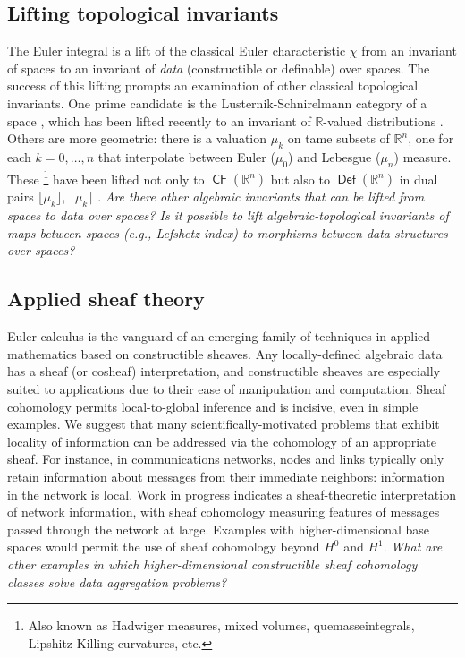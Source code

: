 \documentclass{psapm-l}
\theoremstyle{definition}
\theoremstyle{remark}
\numberwithin{equation}{section}
\begin{document}
\subsection{Lifting topological invariants}
The Euler integral is a lift of the classical Euler characteristic $\chi$ from an invariant of spaces to an invariant of {\em data} (constructible or definable) over spaces. The success of this lifting prompts an examination of other classical topological invariants. One prime candidate is the Lusternik-Schnirelmann category of a space \cite{CLOT}, which has been lifted recently to an invariant of ${{\mathbb R}}$-valued distributions \cite{BG:uni}. Others are more geometric: there is a valuation $\mu_k$ on tame subsets of ${{\mathbb R}}^n$, one for each $k=0,\ldots,n$ that interpolate between Euler ($\mu_0$) and Lebesgue ($\mu_n$) measure. These {{}}\footnote{Also known as Hadwiger measures, mixed volumes, quemasseintegrals, Lipshitz-Killing curvatures, etc.} have been lifted not only to ${{{\operatorname{\mathsf{{CF}}}}}}({{\mathbb R}}^n)$ but also to ${{{\operatorname{\mathsf{{Def}}}}}}({{\mathbb R}}^n)$ in dual pairs $\lfloor\mu_k\rfloor$, $\lceil\mu_k\rceil$ \cite{Wright}. {\em Are there other algebraic invariants that can be lifted from spaces to data over spaces? Is it possible to lift algebraic-topological invariants of maps between spaces ({{\em e.g.}}, Lefshetz index) to morphisms between data structures over spaces?}

\subsection{Applied sheaf theory}
Euler calculus is the vanguard of an emerging family of techniques in applied mathematics based on constructible sheaves. Any locally-defined algebraic data has a sheaf (or cosheaf) interpretation, and constructible sheaves are especially suited to applications due to their ease of manipulation and computation.  Sheaf cohomology permits local-to-global inference and is incisive, even in simple examples. We suggest that many scientifically-motivated problems that exhibit locality of information can be addressed via the cohomology of an appropriate sheaf. For instance, in communications networks, nodes and links typically only retain information about messages from their immediate neighbors: information in the network is local. Work in progress \cite{Rob:logic,Rob:flow,GH} indicates a sheaf-theoretic interpretation of network information, with sheaf cohomology measuring features of messages passed through the network at large. Examples with higher-dimensional base spaces would permit the use of sheaf cohomology beyond $H^0$ and $H^1$. {\em What are other examples in which higher-dimensional constructible sheaf cohomology classes solve data aggregation problems?}
\end{document}
